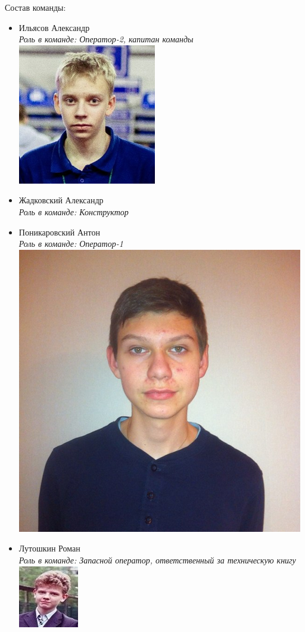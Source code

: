 \large Состав команды:


\begin{itemize}

	\item	Ильясов Александр\\
		\emph{Роль в команде: Оператор-2, капитан команды}\\
		\includegraphics{img/Psi-3.png}\\
	\item   Жадковский Александр\\
		\emph{Роль в команде: Конструктор}\\
	\item	Поникаровский Антон\\
		\emph{Роль в команде: Оператор-1}\\
		\includegraphics{img/Psi-1.png}\\
	\item	Лутошкин Роман\\
		\emph{Роль в команде: Запасной оператор, ответственный за техническую книгу}\\
		\includegraphics{img/Psi-2.png}\\
\end{itemize}


